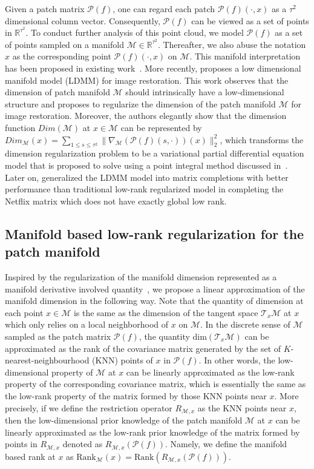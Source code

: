 \documentclass[letterpaper,10pt]{article}
\newcommand{\R}{\mathbb{R}}
\def\P{\mathcal{P}}
\def\M{\mathcal{M}}
\begin{document}
Given a patch matrix $\mathcal{P}(f)$, one can regard each patch $\mathcal{P}(f) (\cdot,x)$ as a $\tau^2$ dimensional column vector. Consequently, $\mathcal{P}(f)$ can be viewed as a set of points in $\R^{\tau^2}$. To conduct further analysis of this point cloud, we model $\mathcal{P}(f)$ as a set of points sampled on a manifold $\mathcal{M} \in \R^{\tau^2}$. Thereafter, we also abuse the notation $x$ as the corresponding point  $\mathcal{P}(f) (\cdot,x)$ on $\mathcal{M}$. This manifold interpretation has been proposed in existing work~\cite{peyre2009manifold,osher2016low}. More recently, \cite{osher2016low} proposes a low dimensional manifold model (LDMM) for image restoration. This work observes that the dimension of patch manifold $\M$ should intrinsically have a low-dimensional structure and proposes to regularize the dimension of the patch manifold $\mathcal{M}$ for image restoration. Moreover, the authors elegantly show that the dimension function $Dim(\mathcal{M})$ at $x \in \mathcal{M}$ can be represented by $Dim_{\mathcal{M}}(x) =\sum_{1 \leq s \leq \tau^2}\|\nabla_\mathcal{M} (\mathcal{P}(f)(s,\cdot))(x)\|_2^2$, which transforms the dimension regularization problem to be a variational partial differential equation model that is proposed to solve using a point integral method discussed in~\cite{li2014point}.
Later on, \cite{kuang2016harmonic} generalized the LDMM model into matrix completions with better performance than traditional low-rank regularized model in completing the Netflix matrix \cite{bennett2007netflix} which does not have exactly global low rank.




\subsection{Manifold based low-rank regularization for the patch manifold}
Inspired by the regularization of the manifold dimension represented as a manifold derivative involved quantity~\cite{osher2016low}, we propose a linear approximation of the manifold dimension in the following way. Note that the quantity of dimension at each point $x\in\mathcal{M}$ is the same as the dimension of the tangent space $\mathcal{T}_{x}\mathcal{M}$ at $x$ which only relies on a local neighborhood of $x$ on $\mathcal{M}$. In the discrete sense of $\M$ sampled as the patch matrix $\P(f)$, the quantity $\mathrm{dim}(\mathcal{T}_x\M)$ can be approximated as the rank of the covariance matrix generated by the set of $K$-nearest-neighbourhood (KNN) points of $x$ in $\P(f)$. In other words, the low-dimensional property of $\M$ at $x$ can be linearly approximated as the low-rank property of the corresponding covariance matrix, which is essentially the same as the low-rank property of the matrix formed by those KNN points near $x$. More precisely, if we define the restriction operator $R_{\mathcal{M},x}$ as the KNN points near $x$, then the low-dimensional prior knowledge of the patch manifold $\M$ at $x$ can be linearly approximated as the low-rank prior knowledge of the matrix formed by points in $R_{\M,x}$ denoted as $R_{\M,x}(\P(f))$. Namely, we define the manifold based rank at $x$ as $\text{Rank}_\M(x) = \text{Rank}(R_{\mathcal{M},x} (\mathcal{P}(f)))$.
\end{document}
